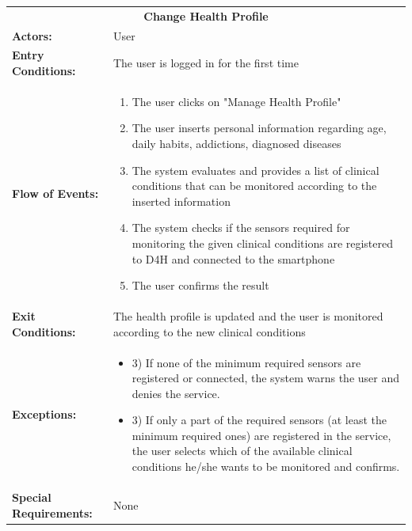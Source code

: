 \begin{table}[H]
	\centering
	{\renewcommand{\arraystretch}{1.5}%
		\begin{tabular}{|@{\hspace{2em}} p{4cm} @{}| p{11cm} @{\qquad}|}
			\cline{1-2}
			\multicolumn{2}{|c|}{\textbf{Change Health Profile}} \\ \cline{1-2}
			\textbf{Actors:} & User \\ \cline{1-2}
			\textbf{Entry Conditions:} & %
 The user is logged in for the first time \\ \cline{1-2}
			\textbf{Flow of Events:} & \begin{enumerate}[topsep=0em, itemsep=-0.2em]
				\item The user clicks on "Manage Health Profile"
				\item The user inserts personal information regarding age, daily habits, addictions, diagnosed diseases
				\item The system evaluates and provides a list of clinical conditions that can be monitored according to the inserted information
				\item The system checks if the sensors required for monitoring the given clinical conditions are registered to D4H and connected to the smartphone
				\item The user confirms the result 
			\end{enumerate} \\ \cline{1-2}
			\textbf{Exit Conditions:} & The health profile is updated and the user is monitored according to the new clinical conditions \\ \cline{1-2}
			\textbf{Exceptions:} & \begin{itemize}[topsep=0em, itemsep=-0.2em]
				\item 3) If none of the minimum required sensors are registered or connected, the system warns the user and denies the service.
				\item 3) If only a part of the required sensors (at least the minimum required ones) are registered in the service, the user selects which of the available clinical conditions he/she wants to be monitored and confirms.
				\end{itemize}  \\ \cline{1-2}
			\textbf{Special Requirements:} & None \\ \cline{1-2}
	\end{tabular}} \quad
\end{table}

